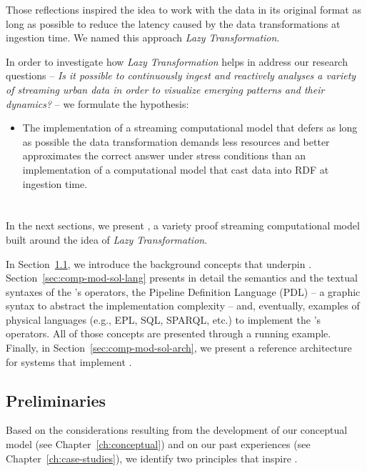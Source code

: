 Those reflections inspired the idea to work with the data in its original format as long as possible to reduce the latency caused by the data transformations at ingestion time. We named this approach \textit{Lazy Transformation}.

In order to investigate how \textit{Lazy Transformation} helps in address our research questions -- \textit{Is it possible to continuously ingest and reactively analyses a variety of streaming urban data in order to visualize emerging patterns and their dynamics?} -- we formulate the hypothesis:

\begin{itemize}[leftmargin=42pt]
\item[\textsf{Hp.2.1}] The implementation of a streaming computational model that defers as long as possible the data transformation demands less resources and better approximates the correct answer under stress conditions than an implementation of a computational model that cast data into RDF at ingestion time.
\end{itemize}

\section{\texorpdfstring{\protect\river{}}{RIVER}}\label{sec:comp-mod-sol}
In the next sections, we present \river{}, a variety proof streaming computational model built around the idea of \textit{Lazy Transformation}.

In Section~\ref{sec:comp-mod-sol-pre}, we introduce the background concepts that underpin \river{}.
Section~\ref{sec:comp-mod-sol-lang} presents in detail the semantics and the textual syntaxes of the \river{}'s operators, the Pipeline Definition Language (PDL) -- a graphic syntax to abstract the implementation complexity -- and, eventually, examples of physical languages (e.g., EPL, SQL, SPARQL, etc.) to implement the \river{}'s operators. All of those concepts are presented through a running example.
Finally, in Section~\ref{sec:comp-mod-sol-arch}, we present a reference architecture for systems that implement \river{}.

\subsection{Preliminaries}\label{sec:comp-mod-sol-pre}
Based on the considerations resulting from the development of our conceptual model (see Chapter~\ref{ch:conceptual}) and on our past experiences (see Chapter~\ref{ch:case-studies}), we identify two principles that inspire \river{}.

